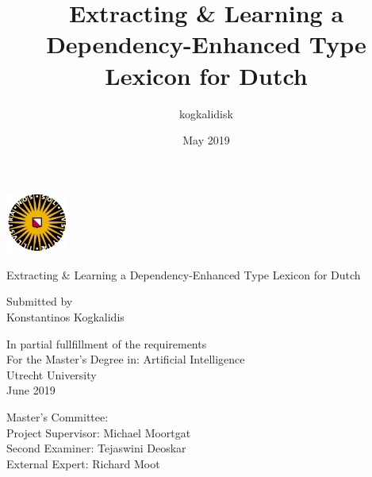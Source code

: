 \documentclass{book}
\title{Extracting \& Learning a Dependency-Enhanced Type Lexicon for Dutch}
\author{kogkalidisk }
\date{May 2019}
\begin{document}
\begin{titlepage}
	\centering
	\includegraphics[width=0.15\textwidth]{Figures/uu.png}\par\vspace{1cm}
	\vspace{1.5cm}
	{\huge Extracting \& Learning a Dependency-Enhanced Type Lexicon for Dutch\par}
	\vspace{2cm}
	{\Large Submitted by \\
	\vspace{1.6em}
	 Konstantinos Kogkalidis}
	 \vspace{2cm}
	 
	 {In partial fullfillment of the requirements\\
	 \vspace{1.6em}
	 For the Master's Degree in: Artificial Intelligence  \\
	 \vspace{1.6em}
	 Utrecht University \\
	 \vspace{1.6em}
	 June 2019
	 }
	\vfill
	\begin{flushleft}
	Master's Committee: \\
	\quad\quad	Project Supervisor: Michael Moortgat \\
	\quad\quad	Second Examiner: Tejaswini Deoskar \\
	\quad\quad	External Expert: Richard Moot
	\end{flushleft}

\end{titlepage}
\end{document}
